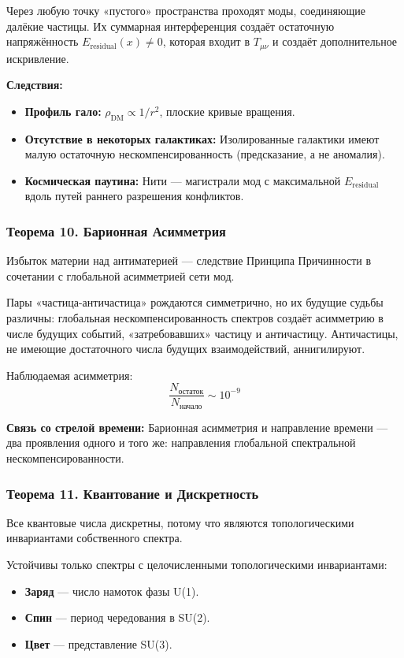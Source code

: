\documentclass[12pt,a4paper]{article}
\begin{document}
Через любую точку «пустого» пространства проходят моды, соединяющие далёкие частицы. Их суммарная интерференция создаёт остаточную напряжённость $E_{\text{residual}}(x) \neq 0$, которая входит в $T_{\mu\nu}$ и создаёт дополнительное искривление.

\textbf{Следствия:}
\begin{itemize}
    \item \textbf{Профиль гало:} $\rho_{\text{DM}} \propto 1/r^2$, плоские кривые вращения.
    \item \textbf{Отсутствие в некоторых галактиках:} Изолированные галактики имеют малую остаточную нескомпенсированность (предсказание, а не аномалия).
    \item \textbf{Космическая паутина:} Нити --- магистрали мод с максимальной $E_{\text{residual}}$ вдоль путей раннего разрешения конфликтов.
\end{itemize}

\subsubsection{Теорема 10. Барионная Асимметрия}
Избыток материи над антиматерией --- следствие Принципа Причинности в сочетании с глобальной асимметрией сети мод.

Пары «частица-античастица» рождаются симметрично, но их будущие судьбы различны: глобальная нескомпенсированность спектров создаёт асимметрию в числе будущих событий, «затребовавших» частицу и античастицу. Античастицы, не имеющие достаточного числа будущих взаимодействий, аннигилируют.

Наблюдаемая асимметрия:
\begin{equation}
    \frac{N_{\text{остаток}}}{N_{\text{начало}}} \sim 10^{-9}
\end{equation}

\textbf{Связь со стрелой времени:} Барионная асимметрия и направление времени --- два проявления одного и того же: направления глобальной спектральной нескомпенсированности.

\subsubsection{Теорема 11. Квантование и Дискретность}
Все квантовые числа дискретны, потому что являются топологическими инвариантами собственного спектра.

Устойчивы только спектры с целочисленными топологическими инвариантами:
\begin{itemize}
    \item \textbf{Заряд} --- число намоток фазы U(1).
    \item \textbf{Спин} --- период чередования в SU(2).
    \item \textbf{Цвет} --- представление SU(3).
\end{itemize}
\end{document}
